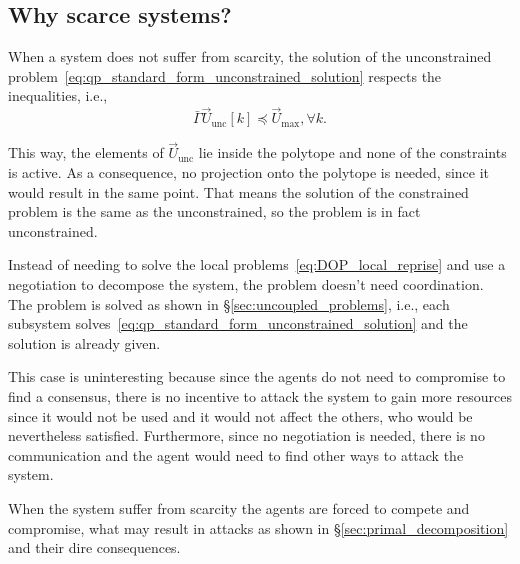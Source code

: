 \documentclass[../main.tex]{subfiles}
\begin{document}
\subsection{Why scarce systems?}\label{sec:why-scarce-systems}

When a system does not suffer from scarcity, the solution of the unconstrained problem~\eqref{eq:qp_standard_form_unconstrained_solution} respects the inequalities, i.e.,
\begin{equation}
\bar{\Gamma}\vec{U}_{\text{unc}}[k]\preceq {\vec{U}}_{\text{max}},\forall k.
\end{equation}

This way, the elements of $\vec{U}_{\text{unc}}$ lie inside the polytope and none of the constraints is active.
As a consequence, no projection onto the polytope is needed, since it would result in the same point.
That means the solution of the constrained problem is the same as the unconstrained, so the problem is in fact unconstrained.

Instead of needing to solve the local problems~\eqref{eq:DOP_local_reprise} and use a negotiation to decompose the system, the problem doesn't need coordination.
The problem is solved as shown in \S\ref{sec:uncoupled_problems}, i.e., each subsystem solves~\eqref{eq:qp_standard_form_unconstrained_solution} and the solution is already given.

This case is uninteresting because since the agents do not need to compromise to find a consensus, there is no incentive to attack the system to gain more resources since it would not be used and it would not affect the others, who would be nevertheless satisfied.
Furthermore, since no negotiation is needed, there is no communication and the agent would need to find other ways to attack the system.

When the system suffer from scarcity the agents are forced to compete and compromise, what may result in attacks as shown in \S\ref{sec:primal_decomposition} and their dire consequences.

\newcommand{\lagrangianname}{\mathscr{L}}
\newcommand{\lagrangian}{\lagrangianname(\vec{U}_{i}[k],\lambdaik,\thetaik)}
\newcommand{\dualfunctionname}{\mathscr{D}}
\newcommand{\dualfunction}{\dualfunctionname(\lambdaik,\thetaik)}
\newcommand{\equalityfunctionname}{h_i}
\newcommand{\equalityfunction}{\equalityfunctionname(\vec{U}_{i}[k],\thetaik)}
\newcommand{\linearcoefi}{\bar{\Gamma}_{i}H_{i}^{-1}\bar{\Gamma_{i}}^{T}}
\end{document}
